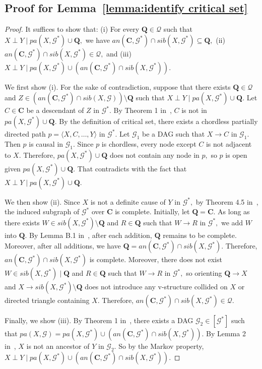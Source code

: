 \documentclass{article}
\begin{document}
\subsection{Proof for Lemma~\ref{lemma:identify critical set}}
\begin{proof}
It suffices to show that: (i) For every $\mathbf{Q}\in \mathcal{Q}$ such that $X\perp Y\mid pa(X,\mathcal{G}^*)\cup \mathbf{Q},$ we have $an(\mathbf{C},\mathcal{G}^*)\cap sib(X,\mathcal{G}^*)\subseteq \mathbf{Q},$ (ii) $an(\mathbf{C},\mathcal{G}^*)\cap sib(X,\mathcal{G}^*)\in \mathcal{Q},$ and (iii) $X\perp Y\mid pa(X,\mathcal{G}^*)\cup (an(\mathbf{C},\mathcal{G}^*)\cap sib(X,\mathcal{G}^*)).$ 

We first show (i). For the sake of contradiction, suppose that there exists $\mathbf{Q}\in \mathcal{Q}$ and $Z\in (an(\mathbf{C},\mathcal{G}^*)\cap sib(X,\mathcal{G})) \setminus \mathbf{Q}$ such that $X\perp Y\mid pa(X,\mathcal{G}^*)\cup \mathbf{Q}.$ Let $C \in \mathbf{C}$ be a descendant of $Z$ in $\mathcal{G}^*.$ By Theorem 1 in~\citet{fang2020ida}, $C$ is not in $pa(X,\mathcal{G}^*) \cup \mathbf{Q}.$ By the definition of critical set, there exists a chordless partially directed path $p=\langle X,C,\dots,Y\rangle$ in $\mathcal{G}^*.$ Let $\mathcal{G}_1$ be a DAG such that $X\to C$ in $\mathcal{G}_1.$ Then $p$ is causal in $\mathcal{G}_1.$ Since $p$ is chordless, every node except $C$ is not adjacent to $X.$ Therefore, $pa(X,\mathcal{G}^*)\cup \mathbf{Q}$ does not contain any node in $p,$ so $p$ is open given $pa(X,\mathcal{G}^*)\cup \mathbf{Q}.$ That contradicts with the fact that $X\perp Y\mid pa(X,\mathcal{G}^*)\cup \mathbf{Q}.$

We then show (ii). Since $X$ is not a definite cause of $Y$ in $\mathcal{G}^*,$ by Theorem 4.5 in~\citet{zuo2022counterfactual}, the induced subgraph of $\mathcal{G}^*$ over $\mathbf{C}$ is complete. Initially, let $\mathbf{Q}=\mathbf{C}.$ As long as there exists $W\in sib(X,\mathcal{G}^*)\setminus \mathbf{Q}$ and $R\in \mathbf{Q}$ such that $W\to R$ in $\mathcal{G}^*,$ we add $W$ into $\mathbf{Q}.$ By Lemma B.1 in~\citet{zuo2022counterfactual}, after each addition, $\mathbf{Q}$ remains to be complete. Moreover, after all additions, we have $\mathbf{Q}=an(\mathbf{C},\mathcal{G}^*)\cap sib(X,\mathcal{G}^*).$ Therefore, $an(\mathbf{C},\mathcal{G}^*)\cap sib(X,\mathcal{G}^*)$ is complete. Moreover, there does not exist $W\in sib(X,\mathcal{G}^*) \mid \mathbf{Q}$ and $R\in \mathbf{Q}$ such that $W\to R$ in $\mathcal{G}^*,$ so orienting $\mathbf{Q}\to X$ and $X\to sib(X,\mathcal{G}^*)\setminus \mathbf{Q}$ does not introduce any v-structure collided on $X$ or directed triangle containing $X.$ Therefore, $an(\mathbf{C},\mathcal{G}^*)\cap sib(X,\mathcal{G}^*)\in \mathcal{Q}.$

Finally, we show (iii). By Theorem 1 in~\citet{fang2020ida}, there exists a DAG $\mathcal{G}_2\in [\mathcal{G}^*]$ such that $pa(X,\mathcal{G})=pa(X,\mathcal{G}^*)\cup (an(\mathbf{C},\mathcal{G}^*)\cap sib(X,\mathcal{G}^*)).$ By Lemma 2 in~\citet{fang2020ida}, $X$ is not an ancestor of $Y$ in $\mathcal{G}_2.$ So by the Markov property, $X\perp Y\mid pa(X,\mathcal{G}^*)\cup (an(\mathbf{C},\mathcal{G}^*)\cap sib(X,\mathcal{G}^*)).$ 
\end{proof}
\end{document}

